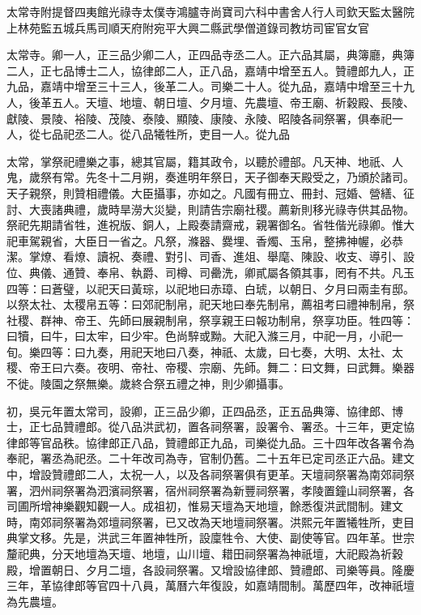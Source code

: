 太常寺附提督四夷館光祿寺太僕寺鴻臚寺尚寶司六科中書舍人行人司欽天監太醫院上林苑監五城兵馬司順天府附宛平大興二縣武學僧道錄司教坊司宦官女官

太常寺。卿一人，正三品少卿二人，正四品寺丞二人。正六品其屬，典簿廳，典簿二人，正七品博士二人，協律郎二人，正八品，嘉靖中增至五人。贊禮郎九人，正九品，嘉靖中增至三十三人，後革二人。司樂二十人。從九品，嘉靖中增至三十九人，後革五人。天壇、地壇、朝日壇、夕月壇、先農壇、帝王廟、祈穀殿、長陵、獻陵、景陵、裕陵、茂陵、泰陵、顯陵、康陵、永陵、昭陵各祠祭署，俱奉祀一人，從七品祀丞二人。從八品犧牲所，吏目一人。從九品

太常，掌祭祀禮樂之事，總其官屬，籍其政令，以聽於禮部。凡天神、地祇、人鬼，歲祭有常。先冬十二月朔，奏進明年祭日，天子御奉天殿受之，乃頒於諸司。天子親祭，則贊相禮儀。大臣攝事，亦如之。凡國有冊立、冊封、冠婚、營繕、征討、大喪諸典禮，歲時旱澇大災變，則請告宗廟社稷。薦新則移光祿寺供其品物。祭祀先期請省牲，進祝版、銅人，上殿奏請齋戒，親署御名。省牲偕光祿卿。惟大祀車駕親省，大臣日一省之。凡祭，滌器、爨埋、香燭、玉帛，整拂神幄，必恭潔。掌燎、看燎、讀祝、奏禮、對引、司香、進俎、舉麾、陳設、收支、導引、設位、典儀、通贊、奉帛、執爵、司樽、司罍洗，卿貳屬各領其事，罔有不共。凡玉四等：曰蒼璧，以祀天曰黃琮，以祀地曰赤璋、白琥，以朝日、夕月曰兩圭有邸。以祭太社、太稷帛五等：曰郊祀制帛，祀天地曰奉先制帛，薦祖考曰禮神制帛，祭社稷、群神、帝王、先師曰展親制帛，祭享親王曰報功制帛，祭享功臣。牲四等：曰犢，曰牛，曰太牢，曰少牢。色尚騂或黝。大祀入滌三月，中祀一月，小祀一旬。樂四等：曰九奏，用祀天地曰八奏，神祇、太歲，曰七奏，大明、太社、太稷、帝王曰六奏。夜明、帝社、帝稷、宗廟、先師。舞二：曰文舞，曰武舞。樂器不徙。陵園之祭無樂。歲終合祭五禮之神，則少卿攝事。

初，吳元年置太常司，設卿，正三品少卿，正四品丞，正五品典簿、協律郎、博士，正七品贊禮郎。從八品洪武初，置各祠祭署，設署令、署丞。十三年，更定協律郎等官品秩。協律郎正八品，贊禮郎正九品，司樂從九品。三十四年改各署令為奉祀，署丞為祀丞。二十年改司為寺，官制仍舊。二十五年已定司丞正六品。建文中，增設贊禮郎二人，太祝一人，以及各祠祭署俱有更革。天壇祠祭署為南郊祠祭署，泗州祠祭署為泗濱祠祭署，宿州祠祭署為新豐祠祭署，孝陵置鐘山祠祭署，各司圃所增神樂觀知觀一人。成祖初，惟易天壇為天地壇，餘悉復洪武間制。建文時，南郊祠祭署為郊壇祠祭署，已又改為天地壇祠祭署。洪熙元年置犧牲所，吏目典掌文移。先是，洪武三年置神牲所，設廩牲令、大使、副使等官。四年革。世宗釐祀典，分天地壇為天壇、地壇，山川壇、耤田祠祭署為神祇壇，大祀殿為祈穀殿，增置朝日、夕月二壇，各設祠祭署。又增設協律郎、贊禮郎、司樂等員。隆慶三年，革協律郎等官四十八員，萬曆六年復設，如嘉靖間制。萬歷四年，改神祇壇為先農壇。

